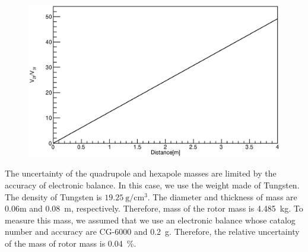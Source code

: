 \documentclass[]{spie}  %
\begin{document}
\begin{figure}
\begin{center}
\includegraphics[width=12cm]{dvsVV.eps}
\caption{}
\label{fig:dvsVV}
\end{center}
\end{figure}
The uncertainty of the quadrupole and hexapole masses are limited by the accuracy of electronic balance. In this case, we use the weight made of Tungsten. The density of Tungsten is $19.25~\mathrm{g/cm^3}$. The diameter and thickness of mass are 0.06m and 0.08~m, respectively. Therefore, mass of the rotor mass is 4.485~kg. To measure this mass, we assumed that we use an electronic balance whose catalog number and accuracy are CG-6000 and 0.2~g. Therefore, the relative uncertainty of the mass of rotor mass is 0.04~\%.
\end{document}
